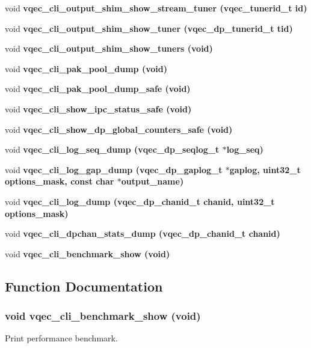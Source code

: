 \begin{CompactItemize}
void \bf{vqec\_\-cli\_\-output\_\-shim\_\-show\_\-stream\_\-tuner} (vqec\_\-tunerid\_\-t id)
\item 
void \bf{vqec\_\-cli\_\-output\_\-shim\_\-show\_\-tuner} (vqec\_\-dp\_\-tunerid\_\-t tid)
\item 
void \bf{vqec\_\-cli\_\-output\_\-shim\_\-show\_\-tuners} (void)
\item 
void \bf{vqec\_\-cli\_\-pak\_\-pool\_\-dump} (void)
\item 
void \bf{vqec\_\-cli\_\-pak\_\-pool\_\-dump\_\-safe} (void)
\item 
void \bf{vqec\_\-cli\_\-show\_\-ipc\_\-status\_\-safe} (void)
\item 
void \bf{vqec\_\-cli\_\-show\_\-dp\_\-global\_\-counters\_\-safe} (void)
\item 
void \bf{vqec\_\-cli\_\-log\_\-seq\_\-dump} (vqec\_\-dp\_\-seqlog\_\-t $\ast$log\_\-seq)
\item 
void \bf{vqec\_\-cli\_\-log\_\-gap\_\-dump} (vqec\_\-dp\_\-gaplog\_\-t $\ast$gaplog, uint32\_\-t options\_\-mask, const char $\ast$output\_\-name)
\item 
void \bf{vqec\_\-cli\_\-log\_\-dump} (vqec\_\-dp\_\-chanid\_\-t chanid, uint32\_\-t options\_\-mask)
\item 
void \bf{vqec\_\-cli\_\-dpchan\_\-stats\_\-dump} (vqec\_\-dp\_\-chanid\_\-t chanid)
\item 
void \bf{vqec\_\-cli\_\-benchmark\_\-show} (void)
\end{CompactItemize}


\subsection{Function Documentation}
\subsubsection{\setlength{\rightskip}{0pt plus 5cm}void vqec\_\-cli\_\-benchmark\_\-show (void)}\label{vqec__cli__interface_8h_a5723437f75714330380b3e54dbd8273}


Print performance benchmark. 
